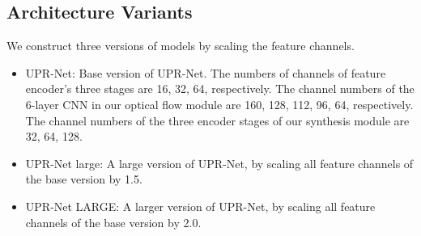\documentclass[10pt,twocolumn,letterpaper]{article}
\begin{document}
\subsection{Architecture Variants}
We construct three versions of models by scaling the feature channels.
\begin{itemize}
    \item UPR-Net: Base version of UPR-Net. The numbers of channels of feature
        encoder's three stages are 16, 32, 64, respectively. The channel numbers
        of the 6-layer CNN in our optical flow module are 160, 128, 112, 96, 64,
        respectively. The channel numbers of the three encoder stages of our
        synthesis module are 32, 64, 128.
    \item UPR-Net large: A large version of UPR-Net, by scaling all feature
        channels of the base version by 1.5.
    \item UPR-Net LARGE: A larger version of UPR-Net, by scaling all feature
        channels of the base version by 2.0.
\end{itemize}
\end{document}
